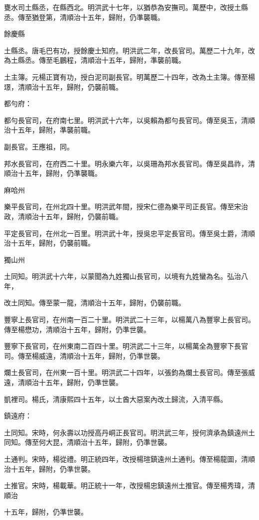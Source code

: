 \begin{pinyinscope}
甕水司土縣丞，在縣西北。明洪武十七年，以猶恭為安撫司。萬歷中，改授土縣丞。傳至猶登第，清順治十五年，歸附，仍準襲職。

餘慶縣

土縣丞。唐毛巴有功，授餘慶土知府。明洪武二年，改長官司。萬歷二十九年，改為土縣丞。傳至毛鵬程，清順治十五年，歸附，準襲前職。

土主簿。元楊正寶有功，授白泥司副長官。明萬歷二十四年，改為土主簿。傳至楊璟，清順治十五年，歸附，仍襲前職。

都勻府：

都勻長官司，在府南七里。明洪武十六年，以吳賴為都勻長官司。傳至吳玉，清順治十五年，歸附，準襲前職。

副長官。王應祖，同。

邦水長官司，在府西二十里。明永樂六年，以吳珊為邦水長官司。傳至吳昌祚，清順治十五年，歸附，仍準襲職。

麻哈州

樂平長官司，在州北四十里。明洪武年間，授宋仁德為樂平司正長官。傳至宋治政，清順治十五年，歸附，仍襲前職。

平定長官司，在州北一百里。明洪武十年，授吳忠平定長官司。傳至吳士爵，清順治十五年，歸附，仍襲前職。

獨山州

土同知。明洪武十六年，以蒙聞為九姓獨山長官司，以境有九姓蠻為名。弘治八年，

改土同知。傳至蒙一龍，清順治十五年，歸附，仍襲前職。

豐寧上長官司，在州南一百二十里。明洪武二十三年，以楊萬八為豐寧上長官司。傳至楊懋功，清順治十五年，歸附，仍準世襲。

豐寧下長官司，在州東南二百四十里。明洪武二十三年，以楊萬全為豐寧下長官司。傳至楊威遠，清順治十五年，歸附，仍準世襲。

爛土長官司，在州東一百十里。明洪武二十四年，以張鈞為爛土長官司。傳至張威遠，清順治十五年，歸附，仍準世襲。

凱裡司。楊氏，清康熙四十五年，以土酋大惡案內改土歸流，入清平縣。

鎮遠府：

土同知。宋時，何永壽以功授高丹峒正長官司。明洪武三年，授何濟承為鎮遠州土同知。傳至何大昆，清順治十五年，歸附，仍準世襲。

土通判。宋時，楊從禮。明正統四年，改授楊瑄鎮遠州土通判。傳至楊龍圖，清順治十五年，歸附，仍準世襲。

土推官。宋時，楊載華。明正統十一年，改授楊忠鎮遠州土推官。傳至楊秀瑋，清順治

十五年，歸附，仍準世襲。


\end{pinyinscope}
